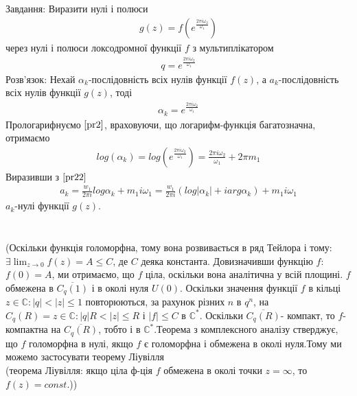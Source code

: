 \documentclass[12pt,a4paper]{article}
\begin{document}
\begin{pryk}
Завдання: Виразити нулі і полюси
\[\begin{array}{l}
g(z)=f(e^{\frac{2\pi i \omega_{2} }{\omega_{1}}})
\end{array}\]
через нулі і полюси локсодромної функції $f$ з мультиплікатором 
\[\begin{array}{l}
q=e^{\frac{2\pi i \omega_{2} }{\omega_{1}}}
\end{array}\]
Розв'язок: Нехай $\alpha_{k} $-послідовність всіх нулів функції $f(z)$, а $a_{k}$-послідовність всіх нулів функції $g(z)$, тоді
\begin{equation}\label{pr2}
\begin{array}{l}
\alpha_{k}=e^{\frac{2\pi i \omega_{2} }{\omega_{1}}}
\end{array}
\end{equation}
Прологарифнуємо $\eqref{pr2}$, враховуючи, що логарифм-функція багатозначна, отримаємо
\begin{equation}\label{pr22}
\begin{array}{l}
log(\alpha_{k})=log(e^{\frac{2\pi i \omega_{2} }{\omega_{1}}})= \frac{2\pi i \omega_{2} }{\omega_{1}}+ 2\pi m_{1} 
\end{array}
\end{equation}
Виразивши з $\eqref{pr22}$ 
\[\begin{array}{l}
a_{k}=\frac{w_{1}}{2\pi i}log\alpha_{k} + m_{1}i\omega_{1}=\frac{w_{1}}{2\pi i}(log\vert\alpha_{k}\vert + iarg\alpha_{k})+m_{1}i\omega_{1}
\end{array}\]
$a_{k}$-нулі функції $g(z)$.
\end{pryk}
\[\begin{array}{l}
\end{array}\]

\begin{pryk}

\end{pryk}
\[\begin{array}{l}
\end{array}\]
(Оскільки функція голоморфна, тому вона розвивається в ряд Тейлора і тому: $\exists\lim_{z \to 0}f(z)=A\leq C$, де $C$ деяка константа. Довизначивши функцію $f$: $f(0)=A$, ми отримаємо, що $f$ ціла, оскільки вона аналітична у всій площині. $f$ обмежена в $\overline{C_{q}(1)}$ і в околі нуля $U(0)$. Оскільки значення функції $f$ в кільці ${z\in \mathbb{C}: \vert q \vert<\vert z \vert \leq 1}$ повторюються, за рахунок різних $n$ в $q^{n}$, на $C_{q}(R)={z\in \mathbb{C}: \vert q \vert R < \vert z \vert \leq R}$   і $\vert f \vert \leq C$ в $\mathbb{C}^{*}$. Оскільки $\overline{C_{q}(R)}$- компакт, то $f$- компактна на $\overline{C_{q}(R)}$, тобто і в $\mathbb{C}^{*}$.Теорема з комплексного аналізу стверджує, що $f$ голоморфна в нулі, якщо $f$ є голоморфна і обмежена в околі нуля.Тому ми можемо застосувати теорему Ліувілля \\
(теорема Ліувілля: якщо ціла ф-ція  $f$ обмежена в околі точки $ z=\infty $, то $f(z)=const$.))\\
\end{document}
